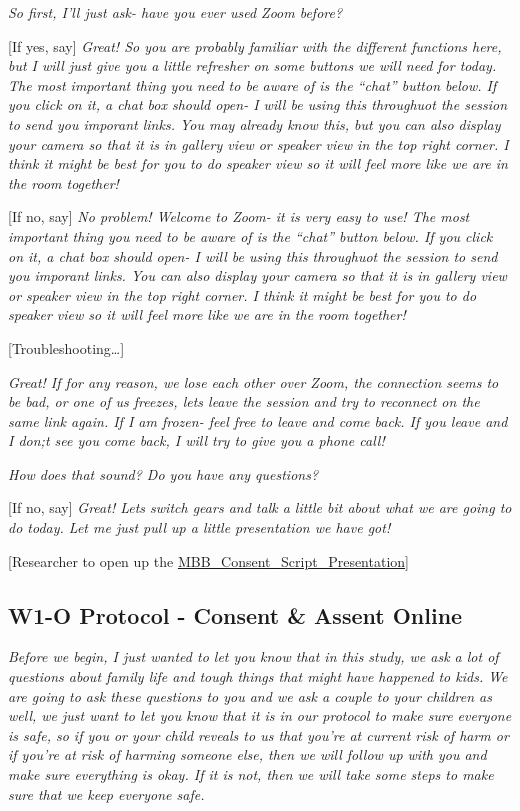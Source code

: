 \documentclass[
]{book}
\begin{document}
\emph{So first, I'll just ask- have you ever used Zoom before?}

{[}If yes, say{]} \emph{Great! So you are probably familiar with the different functions here, but I will just give you a little refresher on some buttons we will need for today. The most important thing you need to be aware of is the ``chat'' button below. If you click on it, a chat box should open- I will be using this throughuot the session to send you imporant links. You may already know this, but you can also display your camera so that it is in gallery view or speaker view in the top right corner. I think it might be best for you to do speaker view so it will feel more like we are in the room together!}

{[}If no, say{]} \emph{No problem! Welcome to Zoom- it is very easy to use! The most important thing you need to be aware of is the ``chat'' button below. If you click on it, a chat box should open- I will be using this throughuot the session to send you imporant links. You can also display your camera so that it is in gallery view or speaker view in the top right corner. I think it might be best for you to do speaker view so it will feel more like we are in the room together!}

{[}Troubleshooting\ldots{]}

\emph{Great! If for any reason, we lose each other over Zoom, the connection seems to be bad, or one of us freezes, lets leave the session and try to reconnect on the same link again. If I am frozen- feel free to leave and come back. If you leave and I don;t see you come back, I will try to give you a phone call!}

\emph{How does that sound? Do you have any questions?}

{[}If no, say{]} \emph{Great! Lets switch gears and talk a little bit about what we are going to do today. Let me just pull up a little presentation we have got!}

{[}Researcher to open up the \href{https://ucla.app.box.com/file/729637683371?sb=/activity}{MBB\_Consent\_Script\_Presentation}{]}

\hypertarget{w1-o-protocol---consent-assent-online}{%
\subsection{W1-O Protocol - Consent \& Assent Online}\label{w1-o-protocol---consent-assent-online}}

\emph{Before we begin, I just wanted to let you know that in this study, we ask a lot of questions about family life and tough things that might have happened to kids. We are going to ask these questions to you and we ask a couple to your children as well, we just want to let you know that it is in our protocol to make sure everyone is safe, so if you or your child reveals to us that you're at current risk of harm or if you're at risk of harming someone else, then we will follow up with you and make sure everything is okay. If it is not, then we will take some steps to make sure that we keep everyone safe.}
\end{document}
